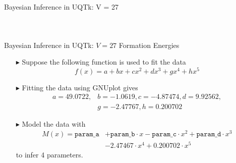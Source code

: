 \documentclass[10pt]{beamer}
\begin{document}
\begin{frame}{Bayesian Inference in UQTk: V = 27}
\begin{columns}[c]
\begin{figure}[ht]
     		\end{figure}	 		
	\end{columns}
\end{frame}

\begin{frame}{Bayesian Inference in UQTk: $V = 27$ Formation Energies}
	\large
	    \begin{itemize}
    	\item[$\blacktriangleright$] Suppose the following function is used to fit
    	the data 
    	$$f(x) = a + b x + c x^2 + d x^3 + g x^4 + h x^5$$
    	\item[$\blacktriangleright$] Fitting the data using GNUplot gives
    	\begin{align*}
    	a = 49.0722, &b = -1.0619, c = -4.87474, d = 9.92562, \\
    	&g = -2.47767, h = 0.200702
    	\end{align*}
    	\item[$\blacktriangleright$] Model the data with
    	\begin{align*}
    	M(x) = \texttt{param\_a} &+ \texttt{param\_b} \cdot x - \texttt{param\_c}
    	\cdot x^2 + \texttt{param\_d} \cdot x^3 \\
    	 &- 2.47467 \cdot x^4 + 0.200702 \cdot x^5
    	\end{align*}
    	to infer 4 parameters.
    \end{itemize}
\end{frame}
\end{document}
